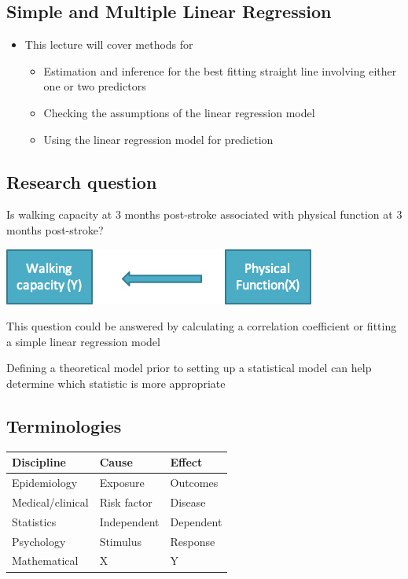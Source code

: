 \documentclass[
]{book}
\providecommand{\tightlist}{%
  \setlength{\itemsep}{0pt}\setlength{\parskip}{0pt}}
\begin{document}
\hypertarget{simple-and-multiple-linear-regression}{%
\subsection{Simple and Multiple Linear Regression}\label{simple-and-multiple-linear-regression}}

\begin{itemize}
\tightlist
\item
  This lecture will cover methods for

  \begin{itemize}
  \tightlist
  \item
    Estimation and inference for the best fitting straight line involving either one or two predictors
  \item
    Checking the assumptions of the linear regression model
  \item
    Using the linear regression model for prediction
  \end{itemize}
\end{itemize}

\hypertarget{research-question}{%
\subsection{Research question}\label{research-question}}

Is walking capacity at 3 months post-stroke associated with physical function at 3 months post-stroke?

\includegraphics[width=0.5\linewidth]{./12_4}

This question could be answered by calculating a correlation coefficient or fitting a simple linear regression model

Defining a theoretical model prior to setting up a statistical model can help determine which statistic is more appropriate

\hypertarget{terminologies}{%
\subsection{Terminologies}\label{terminologies}}

\begin{tabular}{l|l|l}
\hline
Discipline & Cause & Effect\\
\hline
Epidemiology & Exposure & Outcomes\\
\hline
Medical/clinical & Risk factor & Disease\\
\hline
Statistics & Independent & Dependent\\
\hline
Psychology & Stimulus & Response\\
\hline
Mathematical & X & Y\\
\hline
\end{tabular}
\end{document}
